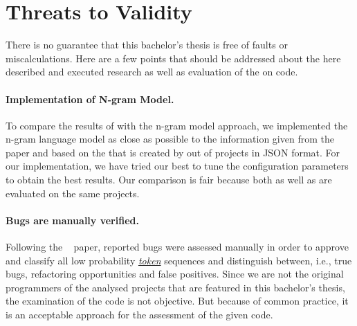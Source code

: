 \section{Threats to Validity}\label{sec:threats-to-validity}
There is no guarantee that this bachelor's thesis is free of faults or miscalculations. Here are a few points that should be addressed about the here described and executed research as well as evaluation of the \ngram{} on \scratch{} code.

\paragraph{Implementation of N-gram Model.}
To compare the results of \litterbox{} with the n-gram model approach, we implemented the n-gram language model as close as possible to the information given from the \bugram{}~\cite{bugram} paper and based on the \AST{} that is created by \litterbox{} out of \scratch{} projects in JSON format. For our implementation, we have tried our best to tune the configuration parameters to obtain the best results. Our comparison is fair because both \litterbox{} as well as \ngram{} are evaluated on the same projects.

\paragraph{Bugs are manually verified.}
Following the \bugram{}~\cite{bugram} paper, reported bugs were assessed manually in order to approve and classify all low probability \hyperref[def:token]{\textit{token}} sequences and distinguish between, i.e., true bugs, refactoring opportunities and false positives. Since we are not the original programmers of the analysed projects that are featured in this bachelor's thesis, the examination of the code is not objective. But because of common practice, it is an acceptable approach for the assessment of the given code.